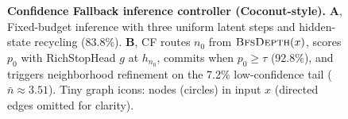 \begin{figure}[!t]
{%
}
\vspace{-2mm}
\caption{\textbf{Confidence Fallback inference controller (Coconut-style).} \textbf{A}, Fixed-budget inference with three uniform latent steps and hidden-state recycling (83.8\%). \textbf{B}, CF routes $n_0$ from $\textsc{BfsDepth}(x)$, scores $p_0$ with RichStopHead $g$ at $h_{n_0}$, commits when $p_0\ge\tau$ (92.8\%), and triggers neighborhood refinement on the 7.2\% low-confidence tail ($\bar{n}\approx 3.51$). Tiny graph icons: nodes (circles) in input $x$ (directed edges omitted for clarity).}
\label{fig:flow}
\end{figure}

